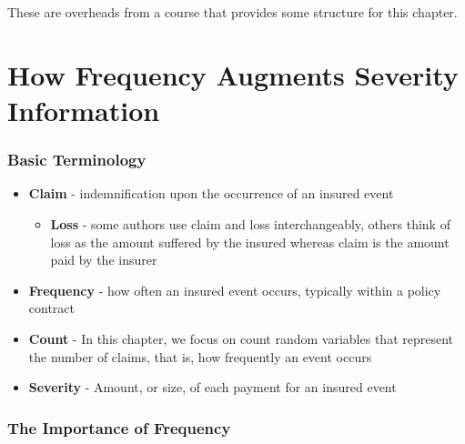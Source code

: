 \documentclass[]{book}
\providecommand{\tightlist}{%
  \setlength{\itemsep}{0pt}\setlength{\parskip}{0pt}}
\begin{document}
These are overheads from a course that provides some structure for this
chapter.

\section{How Frequency Augments Severity
Information}\label{how-frequency-augments-severity-information}

\subsubsection{Basic Terminology}\label{basic-terminology}

\begin{itemize}
\item
  \textbf{Claim} - indemnification upon the occurrence of an insured
  event

  \begin{itemize}
  \tightlist
  \item
    \textbf{Loss} - some authors use claim and loss interchangeably,
    others think of loss as the amount suffered by the insured whereas
    claim is the amount paid by the insurer
  \end{itemize}
\item
  \textbf{Frequency} - how often an insured event occurs, typically
  within a policy contract
\item
  \textbf{Count} - In this chapter, we focus on count random variables
  that represent the number of claims, that is, how frequently an event
  occurs
\item
  \textbf{Severity} - Amount, or size, of each payment for an insured
  event
\end{itemize}

\subsubsection{The Importance of
Frequency}\label{the-importance-of-frequency}
\end{document}

